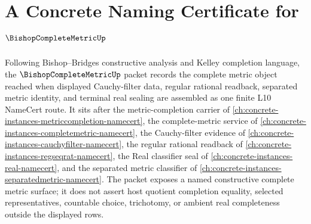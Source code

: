 \chapter{A Concrete Naming Certificate for $\BishopCompleteMetricUp$}
\label{ch:concrete-instances-bishop-complete-metric-namecert}

Following Bishop--Bridges constructive analysis and Kelley completion language, the $\BishopCompleteMetricUp$ packet records the complete metric object reached when displayed Cauchy-filter data, regular rational readback, separated metric identity, and terminal real sealing are assembled as one finite L10 NameCert route. It sits after the metric-completion carrier of \autoref{ch:concrete-instances-metriccompletion-namecert}, the complete-metric service of \autoref{ch:concrete-instances-completemetric-namecert}, the Cauchy-filter evidence of \autoref{ch:concrete-instances-cauchyfilter-namecert}, the regular rational readback of \autoref{ch:concrete-instances-regseqrat-namecert}, the Real classifier seal of \autoref{ch:concrete-instances-real-namecert}, and the separated metric classifier of \autoref{ch:concrete-instances-separatedmetric-namecert}. The packet exposes a named constructive complete metric surface; it does not assert host quotient completion equality, selected representatives, countable choice, trichotomy, or ambient real completeness outside the displayed rows.


